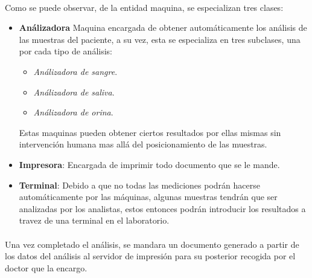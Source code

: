 \documentclass[a4paper,10pt]{article}
\begin{document}
\paragraph{}
Como se puede observar, de la entidad maquina, se especializan tres clases:
\begin{itemize}
	\item {\bf Análizadora} Maquina encargada de obtener automáticamente los análisis de las muestras del paciente, a su vez, esta se especializa en tres subclases, una por cada tipo de análisis:
	\begin{itemize}
		\item {\it Análizadora de sangre}.
		\item {\it Análizadora de saliva}.
		\item {\it Análizadora de orina}.
	\end{itemize}
	Estas maquinas pueden obtener ciertos resultados por ellas mismas sin intervención humana mas allá del posicionamiento de las muestras.
	\item {\bf Impresora}: Encargada de imprimir todo documento que se le mande.
	\item {\bf Terminal}: Debido a que no todas las mediciones podrán hacerse automáticamente por las máquinas, algunas muestras tendrán que ser analizadas por los analistas, estos entonces podrán introducir los resultados a travez de una terminal en el laboratorio.
\end{itemize}
\paragraph{}
Una vez completado el análisis, se mandara un documento generado a partir de los datos del análisis al servidor de impresión para su posterior recogida por el doctor que la encargo.\\

\end{document}
